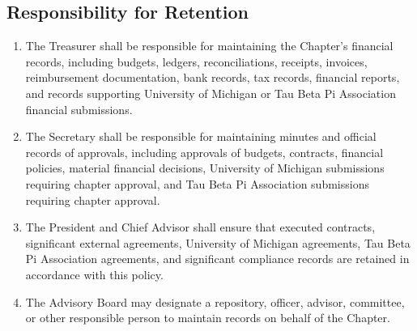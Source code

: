 \subsection{Responsibility for Retention} \label{XII.8}
\begin{enumerate}
    \item {} The Treasurer shall be responsible for maintaining the Chapter’s financial records, including budgets, ledgers, reconciliations, 
    receipts, invoices, reimbursement documentation, bank records, tax records, financial reports, and records supporting University of Michigan or Tau Beta Pi Association financial submissions.
    \item {} The Secretary shall be responsible for maintaining minutes and official records of approvals, including approvals of budgets, contracts, 
    financial policies, material financial decisions, University of Michigan submissions requiring chapter approval, and Tau Beta Pi Association submissions requiring chapter approval.
    \item {} The President and Chief Advisor shall ensure that executed contracts, significant external agreements, University of Michigan agreements, 
    Tau Beta Pi Association agreements, and significant compliance records are retained in accordance with this policy.
    \item {} The Advisory Board may designate a repository, officer, advisor, committee, or other responsible person to maintain records on behalf of the Chapter.
\end{enumerate}


